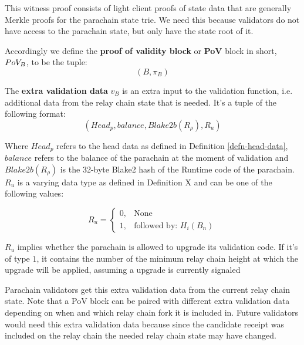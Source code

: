 This witness proof consists of light client proofs of state data that are generally Merkle proofs for the parachain state trie.  We need this because validators do not have access to the parachain state, but only have the state root of it.

\begin{definition}
  \label{defn-pov-block}
  Accordingly we define the {\bf proof of validity block} or {\bf PoV} block in
  short, {\bf $PoV_B$}, to be the tuple:
  \[
  (B, \pi_B)
  \]
\end{definition}

\begin{definition}  \label{defn-extra-validation-data}
  The \textbf{extra validation data} $v_B$  is an extra input to the validation
  function, i.e. additional data from the relay chain state that is needed.
  It's a tuple of the following format:
  \[
  (Head_p, balance, Blake2b(R_\rho), R_u)
  \]

  Where $Head_p$ refers to the head data as defined in Definition
  \ref{defn-head-data}, $balance$ refers to the balance of the parachain at the
  moment of validation  and $Blake2b(R_\rho)$ is the
  32-byte Blake2 hash of the Runtime code of the parachain. $R_u$ is a varying
  data type as defined in Definition X  and can be one of the
  following values:

  \begin{equation}
    R_u =
    \begin{cases}
      0, & \text{None} \\
      1, & \text{followed by: } H_i(B_n)
    \end{cases}
  \end{equation}

  $R_u$ implies whether the parachain is allowed to upgrade its validation code.
  If it's of type $1$, it contains the number of the minimum relay chain height
  at which the upgrade will be applied, assuming a upgrade is currently signaled
  \newline

  Parachain validators get this extra validation data from the current relay
  chain state. Note that a PoV block can be paired with different extra
  validation data depending on when and which relay chain fork it is included
  in. Future validators would need this extra validation data because since the
  candidate receipt was included on the relay chain the needed relay chain state
  may have changed.
\end{definition}


